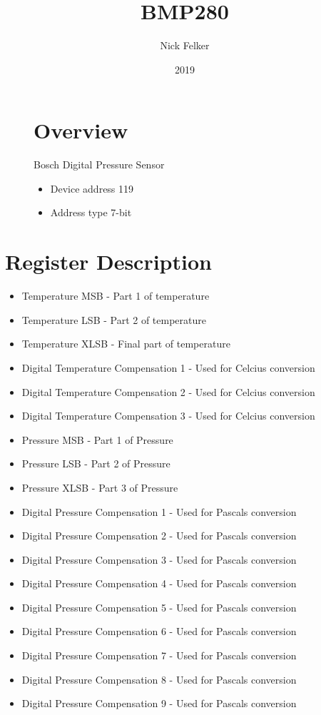 \documentclass[a4paper,12pt,oneside,pdflatex,italian,final,twocolumn]{article}
\title{ BMP280 }
\author{ Nick Felker }
\date{ 2019 }
\begin{document}
\pagestyle{fancy}



\onecolumn


\begin{figure}
\begin{minipage}{0.47\textwidth}

\section{Overview}
    Bosch Digital Pressure Sensor
    \begin{itemize}
        \item Device address 119
        \item Address type 7-bit
    \end{itemize}


\end{minipage}
\hfill

\end{figure}


\section{Register Description}
\begin{itemize}
\item Temperature MSB - Part 1 of temperature
\item Temperature LSB - Part 2 of temperature
\item Temperature XLSB - Final part of temperature
\item Digital Temperature Compensation 1 - Used for Celcius conversion
\item Digital Temperature Compensation 2 - Used for Celcius conversion
\item Digital Temperature Compensation 3 - Used for Celcius conversion
\item Pressure MSB - Part 1 of Pressure
\item Pressure LSB - Part 2 of Pressure
\item Pressure XLSB - Part 3 of Pressure
\item Digital Pressure Compensation 1 - Used for Pascals conversion
\item Digital Pressure Compensation 2 - Used for Pascals conversion
\item Digital Pressure Compensation 3 - Used for Pascals conversion
\item Digital Pressure Compensation 4 - Used for Pascals conversion
\item Digital Pressure Compensation 5 - Used for Pascals conversion
\item Digital Pressure Compensation 6 - Used for Pascals conversion
\item Digital Pressure Compensation 7 - Used for Pascals conversion
\item Digital Pressure Compensation 8 - Used for Pascals conversion
\item Digital Pressure Compensation 9 - Used for Pascals conversion
\end{itemize}
\end{document}
